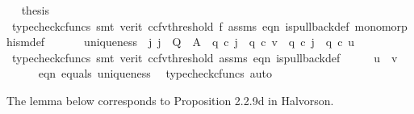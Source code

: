 \begin{isabellebody}
\ \isamarkupfalse%
\ {\isacharquery}{\kern0pt}thesis\isanewline
\ \ \ \ \ \ \isamarkupfalse%
\ {\isacharparenleft}{\kern0pt}typecheck{\isacharunderscore}{\kern0pt}cfuncs{\isacharcomma}{\kern0pt}\ smt\ {\isacharparenleft}{\kern0pt}verit{\isacharcomma}{\kern0pt}\ ccfv{\isacharunderscore}{\kern0pt}threshold{\isacharparenright}{\kern0pt}\ f{}\ assms{\isacharparenleft}{\kern0pt}{}{\isacharcomma}{\kern0pt}{}{\isacharparenright}{\kern0pt}\ eqn{}\ is{\isacharunderscore}{\kern0pt}pullback{\isacharunderscore}{\kern0pt}def\ monomorphism{\isacharunderscore}{\kern0pt}def{}{\isacharparenright}{\kern0pt}\isanewline
\ \ \isamarkupfalse%
\isanewline
\isanewline
\ \ \isamarkupfalse%
\ uniqueness{\isacharcolon}{\kern0pt}\ {\isachardoublequoteopen}{\isasymexists}{\isacharbang}{\kern0pt}\ j{\isachardot}{\kern0pt}\ {\isacharparenleft}{\kern0pt}j\ {\isacharcolon}{\kern0pt}\ Q\ {\isasymrightarrow}\ A\ {\isasymand}\ q{}\ {\isasymcirc}\isactrlsub c\ j\ {\isacharequal}{\kern0pt}\ q{}\ {\isasymcirc}\isactrlsub c\ v\ {\isasymand}\ q{}\ {\isasymcirc}\isactrlsub c\ j\ {\isacharequal}{\kern0pt}\ q{}\ {\isasymcirc}\isactrlsub c\ u{\isacharparenright}{\kern0pt}{\isachardoublequoteclose}\isanewline
\ \ \ \isamarkupfalse%
\ {\isacharparenleft}{\kern0pt}typecheck{\isacharunderscore}{\kern0pt}cfuncs{\isacharcomma}{\kern0pt}\ smt\ {\isacharparenleft}{\kern0pt}verit{\isacharcomma}{\kern0pt}\ ccfv{\isacharunderscore}{\kern0pt}threshold{\isacharparenright}{\kern0pt}\ assms{\isacharparenleft}{\kern0pt}{}{\isacharparenright}{\kern0pt}\ eqn{}\ is{\isacharunderscore}{\kern0pt}pullback{\isacharunderscore}{\kern0pt}def{\isacharparenright}{\kern0pt}\isanewline
\ \ \isamarkupfalse%
\ \isamarkupfalse%
\ {\isachardoublequoteopen}u\ {\isacharequal}{\kern0pt}\ v{\isachardoublequoteclose}\isanewline
\ \ \ \ \isamarkupfalse%
\ eqn{}\ equals\ uniqueness\ \isamarkupfalse%
\ {\isacharparenleft}{\kern0pt}typecheck{\isacharunderscore}{\kern0pt}cfuncs{\isacharcomma}{\kern0pt}\ auto{\isacharparenright}{\kern0pt}\isanewline
{}\isamarkupfalse%
%
\endisatagproof
{\isafoldproof}%
%
\isadelimproof
%
\endisadelimproof
%
\begin{isamarkuptext}%
The lemma below corresponds to Proposition 2.2.9d in Halvorson.%
\end{isamarkuptext}\isamarkuptrue%
\isamarkupfalse%

\end{isabellebody}
